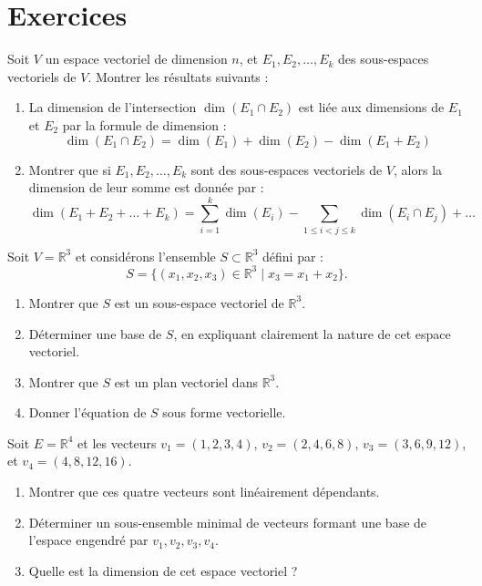 \section{Exercices}
\begin{exercice}
Soit \( V \) un espace vectoriel de dimension \( n \), et \( E_1, E_2, \dots, E_k \) des sous-espaces vectoriels de \( V \). Montrer les résultats suivants :
\begin{enumerate}
    \item La dimension de l'intersection \( \dim(E_1 \cap E_2) \) est liée aux dimensions de \( E_1 \) et \( E_2 \) par la formule de dimension : 
    \[
    \dim(E_1 \cap E_2) = \dim(E_1) + \dim(E_2) - \dim(E_1 + E_2)
    \]
    \item Montrer que si \( E_1, E_2, \dots, E_k \) sont des sous-espaces vectoriels de \( V \), alors la dimension de leur somme est donnée par :
    \[
    \dim(E_1 + E_2 + \dots + E_k) = \sum_{i=1}^k \dim(E_i) - \sum_{1 \leq i < j \leq k} \dim(E_i \cap E_j) + \dots
    \]
\end{enumerate}
\end{exercice}
\begin{exercice}
Soit \( V = \mathbb{R}^3 \) et considérons l'ensemble \( S \subset \mathbb{R}^3 \) défini par :
\[
S = \{(x_1, x_2, x_3) \in \mathbb{R}^3 \mid x_3 = x_1 + x_2\}.
\]
\begin{enumerate}
    \item Montrer que \( S \) est un sous-espace vectoriel de \( \mathbb{R}^3 \).
    \item Déterminer une base de \( S \), en expliquant clairement la nature de cet espace vectoriel.
    \item Montrer que \( S \) est un plan vectoriel dans \( \mathbb{R}^3 \).
    \item Donner l'équation de \( S \) sous forme vectorielle.
\end{enumerate}
\end{exercice}
\begin{exercice}
Soit \( E = \mathbb{R}^4 \) et les vecteurs \( v_1 = (1, 2, 3, 4) \), \( v_2 = (2, 4, 6, 8) \), \( v_3 = (3, 6, 9, 12) \), et \( v_4 = (4, 8, 12, 16) \).
\begin{enumerate}
    \item Montrer que ces quatre vecteurs sont linéairement dépendants.
    \item Déterminer un sous-ensemble minimal de vecteurs formant une base de l'espace engendré par \( v_1, v_2, v_3, v_4 \).
    \item Quelle est la dimension de cet espace vectoriel ?
\end{enumerate}
\end{exercice}


